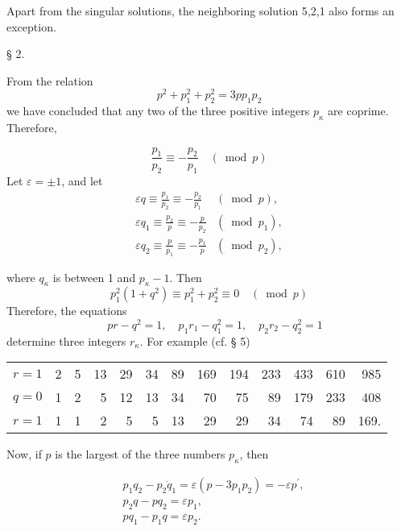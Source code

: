 \documentclass[12pt]{article}
\begin{document}
Apart from the singular solutions, the neighboring solution 5,2,1 also forms an exception.

\bigskip

\centerline{§ 2.}

\bigskip


From the relation
$$
p^{2}+p_{1}^{2}+p_{2}^{2}=3 p p_{1} p_{2}
$$
we have concluded that any two of the three positive integers $p_{\kappa}$ are coprime. Therefore,

\begin{equation*}
\frac{p_{1}}{p_{2}} \equiv-\frac{p_{2}}{p_{1}} \quad(\bmod p) \tag{1.}
\end{equation*}
Let $\varepsilon= \pm 1$, and let
\begin{align*}
\varepsilon q \equiv \frac{p_{1}}{p_{2}} \equiv-\frac{p_{2}}{p_{1}} & (\bmod p), \\
\varepsilon q_{1} \equiv \frac{p_{2}}{p} \equiv-\frac{p}{p_{2}} & \left(\bmod p_{1}\right),  \tag{2.}\\
\varepsilon q_{2} \equiv \frac{p}{p_{1}} \equiv-\frac{p_{1}}{p} & \left(\bmod p_{2}\right),
\end{align*}

where $q_{\kappa}$ is between 1 and $p_{\kappa}-1$. Then
$$
p_{1}^{2}\left(1+q^{2}\right) \equiv p_{1}^{2}+p_{2}^{2} \equiv 0 \quad(\bmod p)
$$
Therefore, the equations
\begin{equation*}
\quad p r-q^{2}=1, \quad p_{1} r_{1}-q_{1}^{2}=1, \quad p_{2} r_{2}-q_{2}^{2}=1
\tag{3}
\end{equation*}
determine three integers $r_{\kappa}$. For example (cf. § 5)

\bigskip

\begin{tabular}{rrrrrrrrrrrrr}
$r=1$ & 2 & 5 & 13 & 29 & 34 & 89 & 169 & 194 & 233 & 433 & 610 & 985 \\
$q=0$ & 1 & 2 & 5 & 12 & 13 & 34 & 70 & 75 & 89 & 179 & 233 & 408 \\
$r=1$ & 1 & 1 & 2 & 5 & 5 & 13 & 29 & 29 & 34 & 74 & 89 & 169.
\end{tabular}

\bigskip

Now, if $p$ is the largest of the three numbers $p_{\kappa}$, then

\begin{align*}
& p_{1} q_{2}-p_{2} \dot{q}_{1}=\varepsilon\left(p-3 p_{1} p_{2}\right)=-\varepsilon p^{\prime}, \\
& p_{2} q-p q_{2}=\varepsilon p_{1},  \tag{4.}\\
& p q_{1}-p_{1} q=\varepsilon p_{2} .
\end{align*}
\end{document}
